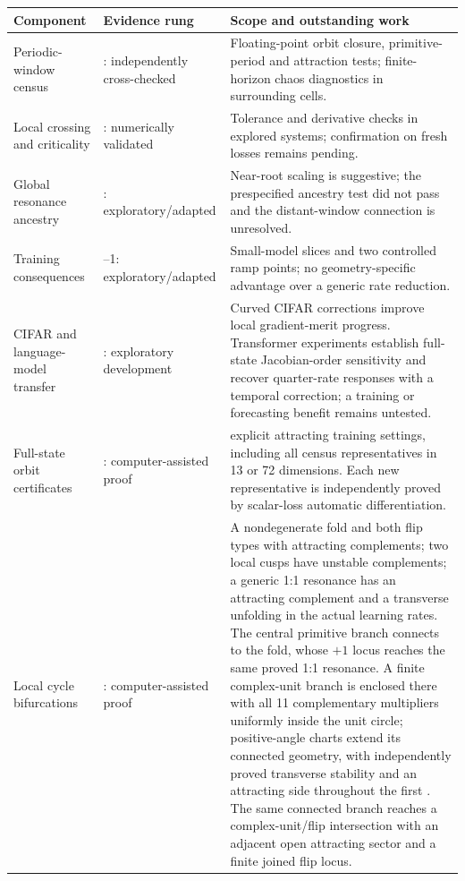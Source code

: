 \documentclass[11pt,letterpaper]{article}
\begin{document}
\begin{table}[htbp]
\centering\small
\begin{tabular}{@{}>{\raggedright\arraybackslash}p{3.0cm}>{\raggedright\arraybackslash}p{3.1cm}>{\raggedright\arraybackslash}p{7.8cm}@{}}
\toprule
Component & Evidence rung & Scope and outstanding work \\
\midrule
Periodic-window census & 2: independently cross-checked & Floating-point orbit closure, primitive-period
and attraction tests; finite-horizon chaos diagnostics in surrounding cells. \\
Local crossing and criticality & 1: numerically validated & Tolerance and derivative checks in explored
systems; confirmation on fresh losses remains pending. \\
Global resonance ancestry & 0: exploratory/adapted & Near-root scaling is suggestive; the prespecified
ancestry test did not pass and the distant-window connection is unresolved. \\
Training consequences & 0--1: exploratory/adapted & Small-model slices and two controlled ramp points; no
geometry-specific advantage over a generic rate reduction. \\
CIFAR and language-model transfer & 0: exploratory development & Curved CIFAR corrections improve local gradient-merit progress. Transformer experiments establish full-state Jacobian-order sensitivity and recover quarter-rate responses with a temporal correction; a training or forecasting benefit remains untested. \\
Full-state orbit certificates & 3: computer-assisted proof & \nCertifiedOrbits{} explicit attracting training settings, including all \nCensusAll{} census representatives in 13 or 72 dimensions. Each new representative is independently proved by scalar-loss automatic differentiation. \\
Local cycle bifurcations & 3: computer-assisted proof & A nondegenerate fold and both flip types with attracting complements; two local cusps have unstable complements; a generic 1:1 resonance has an attracting complement and a transverse unfolding in the actual learning rates. The central primitive branch connects to the fold, whose $+1$ locus reaches the same proved 1:1 resonance. A finite complex-unit branch is enclosed there with all 11 complementary multipliers uniformly inside the unit circle; \nPALVisualCharts{} positive-angle charts extend its connected geometry, with independently proved transverse stability and an attracting side throughout the first \nPALStableCharts{}. The same connected branch reaches a complex-unit/flip intersection with an adjacent open attracting sector and a finite joined flip locus. \\

\end{tabular}
\end{table}
\end{document}

